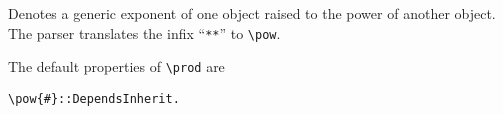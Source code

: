 
Denotes a generic exponent of one object raised to the power of
another object. The parser translates the infix ``\verb|**|''
to \verb|\pow|.

The default properties of \verb|\prod| are
\begin{verbatim}
\pow{#}::DependsInherit.
\end{verbatim}
~


